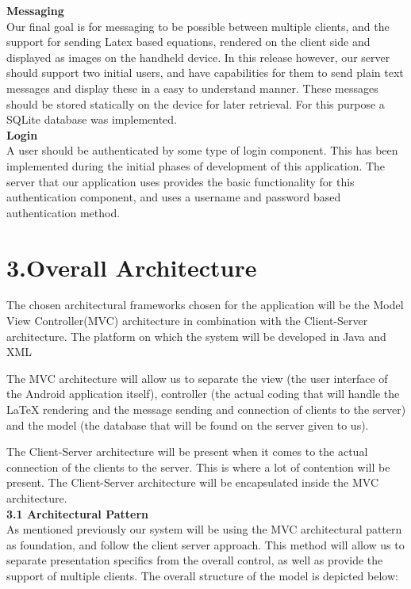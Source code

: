 \documentclass[29pt,a4paper]{moderncv}
\begin{document}
		
		\noindent\textbf{Messaging}
		\\Our final goal is for messaging to be possible between multiple clients, and the support for sending Latex based equations, rendered on the client side and displayed as images on the handheld device. In this release however, our server should support two initial users, and have capabilities for them to send plain text messages and display these in a easy to understand manner.  These messages should be stored statically on the device for later retrieval.  For this purpose a SQLite database was implemented.\\
		
		\noindent\textbf{Login}
		\\A user should be authenticated by some type of login component.  This has been implemented during the initial phases of development of this application.  The server that our application uses provides the basic functionality for this authentication component, and uses a username and password based authentication method.
		
		
	\vspace{5mm}
	
\newpage	
	\section*{\textbf{3.Overall Architecture}}
	\vspace{4mm}
		\noindent The chosen architectural frameworks chosen for the application will be the Model View Controller(MVC) architecture in combination with the Client-Server architecture. The platform on which the system will be developed in Java and XML
		
		\parindent 5mm The MVC architecture will allow us to separate the view (the user interface of the Android application itself),  controller (the actual coding that will handle the LaTeX rendering and the message sending and connection of clients to the server) and the model (the database that will be found on the server given to us).
		
		\parindent 5mm The Client-Server architecture will be present when it comes to the actual connection of the clients to the server. This is where a lot of contention will be present. The Client-Server architecture will be encapsulated inside the MVC architecture.\\

		\noindent \textbf{3.1 Architectural Pattern}
			\\As mentioned previously our system will be using the MVC architectural pattern as foundation, and follow the client server approach. This method will allow us to separate presentation specifics from the overall control, as well as provide the support of multiple clients. The overall structure of the model is depicted below:\\
			
\end{document}
